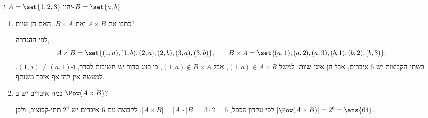 יהיו $A=\set{1,2,3}$ ו-$B=\set{a,b}$.
\begin{enumerate}
\item כתבו את $A\times B$ ואת $B\times A$. האם הן שוות?
\begin{solbox}
לפי ההגדרה,
\[
A\times B=\set{(1,a),(1,b),(2,a),(2,b),(3,a),(3,b)},\qquad
B\times A=\set{(a,1),(a,2),(a,3),(b,1),(b,2),(b,3)}.
\]
בשתי הקבוצות יש 6 איברים, אבל הן \textbf{אינן שוות}: למשל $(1,a)\in A\times B$, אבל $(1,a)\notin B\times A$, כי בזוג סדור יש חשיבות לסדר, ו-$(1,a)\neq(a,1)$. למעשה אין להן אף איבר משותף.
\end{solbox}
\item כמה איברים יש ב-$\Pow(A\times B)$?
\begin{solbox}
לפי עקרון הכפל, $|A\times B|=|A|\cdot|B|=3\cdot2=6$. לקבוצה עם 6 איברים יש $2^6$ תתי-קבוצות, ולכן $|\Pow(A\times B)|=2^6=\ans{64}$.
\end{solbox}
\end{enumerate}
